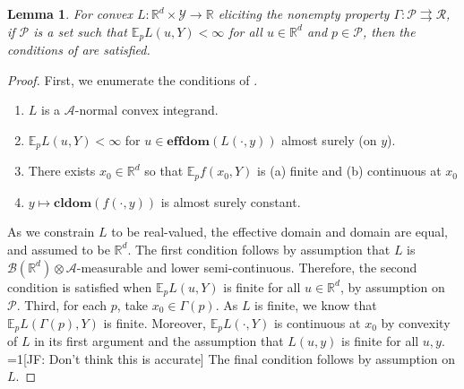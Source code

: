 \documentclass[12pt]{article}
\newcommand{\Comments}{1}
\newcommand{\mynote}[2]{\ifnum\Comments=1\textcolor{#1}{#2}\fi}
\newcommand{\jessie}[1]{\mynote{green!75!black}{[JF: #1]}}
\newcommand{\reals}{\mathbb{R}}
\newcommand{\toto}{\rightrightarrows}
\newcommand{\A}{\mathcal{A}}
\newcommand{\B}{\mathcal{B}}
\newcommand{\E}{\mathbb{E}}
\renewcommand{\P}{\mathcal{P}}
\newcommand{\R}{\mathcal{R}}
\newcommand{\Y}{\mathcal{Y}}
\newcommand{\cl}{\mathbf{cl}}
\newcommand{\dom}{\mathbf{dom}}
\newcommand{\effdom}{\mathbf{effdom}}
\newtheorem{lemma}{Lemma}
\begin{document}
\begin{lemma}\label{lem:conditions-sat}
	For convex $L : \reals^d \times \Y \to \reals$ eliciting the nonempty property $\Gamma:\P\toto\R$, if $\P$ is a set such that $\E_p L(u,Y) < \infty$ for all $u \in \reals^d$ and $p \in \P$, then the conditions of \cite[Corollary 1]{rockafellar1982interchange} are satisfied.
\end{lemma}
\begin{proof}
	First, we enumerate the conditions of \cite[Corollary 1]{rockafellar1982interchange}.\begin{enumerate}
		\item $L$ is a $\A$-normal convex integrand.
		\item $\E_p L(u,Y) < \infty$ for $u \in \effdom(L(\cdot,y))$ almost surely (on $y$).
		\item There exists $x_0 \in \reals^d$ so that $\E_p f(x_0, Y)$ is (a) finite and (b) continuous at $x_0$
		\item $y \mapsto \cl \dom (f(\cdot, y))$ is almost surely constant.
	\end{enumerate}


As we constrain $L$ to be real-valued, the effective domain and domain are equal, and assumed to be $\reals^d$.
The first condition follows by assumption that $L$ is $\B(\reals^d) \otimes \A$-measurable and lower semi-continuous.
Therefore, the second condition is satisfied when $\E_p L(u,Y)$ is finite for all $u \in \reals^d$, by assumption on $\P$.
Third, for each $p$, take $x_0 \in \Gamma(p)$.
As $L$ is finite, we know that $\E_p L(\Gamma(p), Y)$ is finite.
Moreover, $\E_p L(\cdot, Y)$ is continuous at $x_0$ by convexity of $L$ in its first argument and the assumption that $L(u,y)$ is finite for all $u,y$. \jessie{Don't think this is accurate}
The final condition follows by assumption on $L$.
\end{proof}



\end{document}

